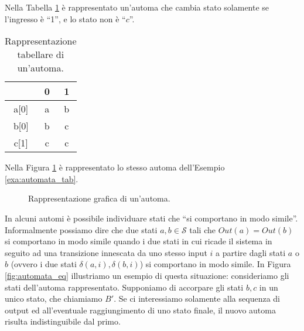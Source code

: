 \begin{example}
    Nella Tabella \ref{fig:tab_automata} è rappresentato un'automa che cambia stato solamente se l'ingresso è ``1'', e lo stato non è ``$c$''.
    \begin{table}[t]
        \centering
        \begin{tabular}{ c | c c }
            \hline
            & 0 & 1\\
            \hline
            a[0] & a & b \\
            b[0] & b & c \\
            c[1] & c & c \\
            \hline
          \end{tabular}
        \caption{Rappresentazione tabellare di un'automa.}
        \label{fig:tab_automata}
    \end{table}
    \label{exa:automata_tab}
\end{example}

\begin{example}
    Nella Figura \ref{fig:automata} è rappresentato lo stesso automa dell'Esempio \ref{exa:automata_tab}.
    \begin{figure}[t]
        \centering
        \caption{Rappresentazione grafica di un'automa.}
        \label{fig:automata}
    \end{figure}
\end{example}

In alcuni automi è possibile individuare stati che ``si comportano in modo simile''. Informalmente possiamo dire che due stati $a,b \in \mathcal{S}$ tali che $Out(a) = Out(b)$ si comportano in modo simile quando i due stati in cui ricade il sistema in seguito ad una transizione innescata da uno stesso input $i$ a partire dagli stati $a$ o $b$ (ovvero i due stati $\delta(a,i), \delta(b,i)$) si comportano in modo simile. In Figura \ref{fig:automata_eq} illustriamo un esempio di questa situazione: consideriamo gli stati dell'automa rappresentato. Supponiamo di accorpare gli stati $b,c$ in un unico stato, che chiamiamo $B'$. Se ci interessiamo solamente alla sequenza di output ed all'eventuale raggiungimento di uno stato finale, il nuovo automa risulta indistinguibile dal primo.

